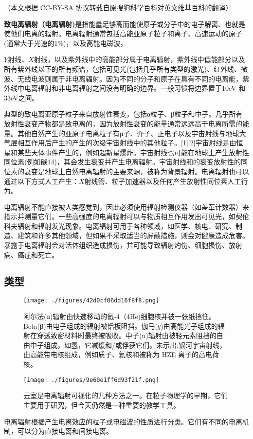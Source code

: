 
（本文根据 CC-BY-SA 协议转载自原搜狗科学百科对英文维基百科的翻译）

\textbf{致电离辐射（电离辐射)}是指能量足够高而能使原子或分子中的电子解离、也就是使他们电离的辐射。电离辐射通常包括高能亚原子粒子和离子、高速运动的原子(通常大于光速的1\%)，以及高能电磁波。

$Y$射线、$X$射线，以及紫外线中的高能部分属于电离辐射，紫外线中低能部分以及所有紫外线以下的所有频谱，包括可见光(包括几乎所有类型的激光)、红外线、微波、无线电波则属于非电离辐射。因为不同的分子和原子在具有不同的电离能，紫外线中电离辐射和非电离辐射之间没有明确的边界。一般习惯将边界置于10eV 和33eV之间。

典型的致电离亚原子粒子来自放射性衰变，包括α粒子、β粒子和中子。几乎所有放射性衰变产物都是致电离的，因为放射性衰变的能量通常远远高于电离所需的能量。其他自然产生的亚原子电离粒子有μ子、介子、正电子以及宇宙射线与地球大气层相互作用后产生的产生的次级宇宙射线中的其他粒子。[1][2]宇宙射线是由恒星和某些天体事件产生的，例如超新星爆炸。宇宙射线也可能在地球上产生放射性同位素(例如碳14)，其会发生衰变并产生电离辐射。宇宙射线和的衰变放射性的同位素的衰变是地球上自然电离辐射的主要来源，被称为背景辐射。电离辐射也可以通过以下方式人工产生：$X$射线管、粒子加速器以及任何产生放射性同位素人工行为。

电离辐射不能直接被人类感觉到，因此必须使用辐射检测仪器（如盖革计数器）来指示并测量它们。一些高强度的电离辐射可以与物质相互作用发出可见光，如契伦科夫辐射和辐射发光现象。电离辐射可用于各种领域，如医学、核电、研究、制造、建筑和许多其他领域，但如果不采取适当的屏蔽措施，则会对健康造成危害。暴露于电离辐射会对活体组织造成损伤，并可能导致辐射灼伤、细胞损伤、放射病、癌症和死亡。

\subsection{类型}
\begin{figure}[ht]
\centering
\texttt{[image: ./figures/42d0cf06dd16f8f8.png]}
\caption{阿尔法(α)辐射由快速移动的氦-4（4He)细胞核并被一张纸挡住。Beta(β)由电子组成的辐射被铝板阻挡。伽马(γ)由高能光子组成的辐射在穿透致密材料时最终被吸收。中子(n)辐射由被轻元素阻挡的自由中子组成，如氢，它减缓和/或俘获它们。未示出:银河宇宙射线，由高能带电核组成，例如质子、氦核和被称为 HZE 离子的高电荷核。} \label{fig_DLFS_1}
\end{figure}
\begin{figure}[ht]
\centering
\texttt{[image: ./figures/9e60e1ff6d93f21f.png]}
\caption{云室是电离辐射可视化的几种方法之一。在粒子物理学的早期，它们主要用于研究，但今天仍然是一种重要的教学工具。} \label{fig_DLFS_2}
\end{figure}
电离辐射根据产生电离效应的粒子或电磁波的性质进行分类。它们有不同的电离机制，可以分为直接电离和间接电离。

